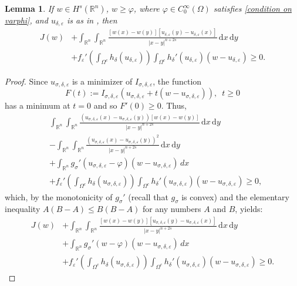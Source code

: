 \documentclass[11pt, reqno]{amsart}
\newtheorem{lemma}{Lemma}
\numberwithin{equation}{section}
\numberwithin{theorem}{section}
\numberwithin{lemma}{section}
\numberwithin{corollary}{section}
\numberwithin{remark}{section}
\numberwithin{proposition}{section}
\numberwithin{definition}{section}
\newcommand{\R}{\mathbb{R}}
\newcommand{\e}{\varepsilon}
\begin{document}
\begin{lemma}\label{l4.1}
	If $w\in H^s(\R^n)$, $w\geq\varphi$, where $\varphi\in C_0^\infty(\Omega)$ satisfies \eqref{condition on varphi}, and $u_{\delta,\e}$ is as in , then
	\begin{equation}\label{4.1}
	\begin{split}
	J(w)&+\int_{\R^n}\int_{\R^n}\frac{[w(x)-w(y)][u_{\delta,\varepsilon}(y)-u_{\delta,\varepsilon}(x)]}{|x-y|^{n+2s}}\,\mathrm{d}x\,\mathrm{d}y \\
	&+f_\e'\left(\int_{\Omega^c}h_\delta(u_{\delta,\e})\right)
	\int_{\Omega^c}h_\delta'(u_{\delta,\e})(w-u_{\delta,\e})\geq0.
	\end{split}
	\end{equation}
\end{lemma}
\begin{proof}
	Since $u_{\sigma,\delta,\e}$ is a minimizer of $I_{\sigma,\delta,\e}$, the function
	$$
	F(t) := I_{\sigma,\delta,\e}(u_{\sigma,\delta,\e}+t(w-u_{\sigma,\delta,\e})),\,\,\,t\ge0
	$$
	has a minimum at $t=0$ and so $F'(0) \ge 0$. Thus,
	\[
	\begin{split}
	&\int_{\R^n}\int_{\R^n}\frac{\left(u_{\sigma,\delta,\varepsilon}(x)-u_{\sigma,\delta,\varepsilon}(y)\right)\left[w(x)-w(y)\right]}{|x-y|^{n+2s}}\,\mathrm{d}x\,\mathrm{d}y\\
	&-\int_{\R^n}\int_{\R^n}\frac{(u_{\sigma,\delta,\varepsilon}(x)-u_{\sigma,\delta,\varepsilon}(y))^2}{|x-y|^{n+2s}}\,\mathrm{d}x\,\mathrm{d}y\\
	&+\int_{\R^n}g_\sigma'(u_{\sigma,\delta,\e}-\varphi)(w-u_{\sigma,\delta,\varepsilon})\,dx\\
	&+f_\e'\left(\int_{\Omega^c}h_\delta(u_{\sigma,\delta,\e})\right)
	\int_{\Omega^c}h_\delta'(u_{\sigma,\delta,\e})(w-u_{\sigma,\delta,\e})\geq0,
	\end{split}
	\]
	which, by the monotonicity of $g_\sigma'$ (recall that $g_\sigma$ is convex) and the elementary inequality $A(B-A)\leq B(B-A)$ for any numbers $A$ and $B$, yields:
	\begin{equation}\label{4.2}
	\begin{split}
	J(w)&+\int_{\R^n}\int_{\R^n}\frac{[w(x)-w(y)][u_{\sigma,\delta,\varepsilon}(y)-u_{\sigma,\delta,\varepsilon}(x)]}{|x-y|^{n+2s}}\,\mathrm{d}x\,\mathrm{d}y\\
	&+\int_{\R^n}g_\sigma'(w-\varphi)(w-u_{\sigma,\delta,\varepsilon})\,dx\\
	&+	f_\e'\left(\int_{\Omega^c}h_\delta(u_{\sigma,\delta,\e})\right)
	\int_{\Omega^c}h_\delta'(u_{\sigma,\delta,\e})(w-u_{\sigma,\delta,\e})\geq0.

\end{split}
\end{equation}
\end{proof}
\end{document}
